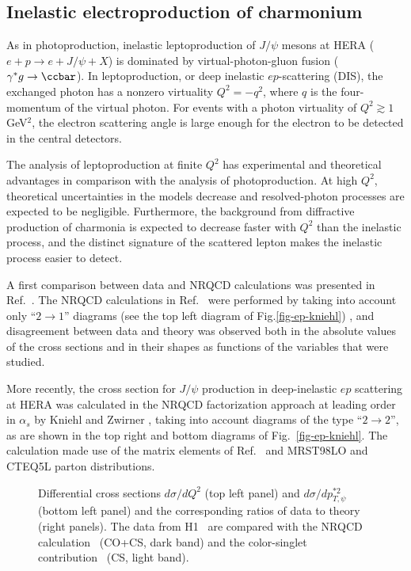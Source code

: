 \subsection{Inelastic electroproduction of charmonium}
\label{prodsec:hera:dis}


As in photoproduction, inelastic leptoproduction of $J/\psi$ mesons at
HERA ($e+p\rightarrow e+J/\psi+X$) is dominated by virtual-photon-gluon
fusion ($\gamma^*g\rightarrow \ccbar$). In leptoproduction, or deep
inelastic $ep$-scattering (DIS), the exchanged photon has a nonzero
virtuality $Q^2=-q^2$, where $q$ is the four-momentum of the virtual
photon. For events with a photon virtuality of $Q^2\gtrsim 1$ GeV$^2$,
the electron scattering angle is large enough for the electron to be
detected in the central detectors.

The analysis of leptoproduction at finite $Q^2$ has experimental and
theoretical advantages in comparison with the analysis of
photoproduction. At high $Q^2$, theoretical uncertainties in the models
decrease and resolved-photon processes are expected to be negligible.
Furthermore, the background from diffractive production of charmonia is
expected to decrease faster with $Q^2$ than the inelastic process, and
the distinct signature of the scattered lepton makes the inelastic
process easier to detect.

A first comparison between data and NRQCD calculations was presented in
Ref.~\cite{Adloff:1999zs}.  The NRQCD calculations in
Ref.~\cite{Adloff:1999zs} were performed by taking into account only
``$2\rightarrow 1$'' diagrams (see the top left diagram of
Fig.\ref{fig-ep-kniehl}) \cite{Fleming:1997fq}, and disagreement between
data and theory was observed both in the absolute values of the cross
sections and in their shapes as functions of the variables that were
studied.

More recently, the cross section for $J/\psi$ production in
deep-inelastic $ep$ scattering at HERA was calculated in the NRQCD
factorization approach at leading order in $\alpha_s$ by Kniehl and
Zwirner \cite{Kniehl:2001tk}, taking into account diagrams of the type
``$2\rightarrow 2$'', as are shown in the top right and bottom diagrams
of Fig.~\ref{fig-ep-kniehl}. The calculation made use of the matrix
elements of Ref.~\cite{Braaten:1999qk} and MRST98LO \cite{Martin:1998sq}
and CTEQ5L \cite{Lai:1999wy} parton distributions.

\begin{figure}
\caption{Differential cross sections $d\sigma / dQ^2$ (top left panel)
and $d\sigma/dp_{T,\psi}^{*2}$ (bottom left panel) and the corresponding
ratios of data to theory (right panels). 
The data from H1~\cite{Adloff:2002ey} are compared
with the NRQCD  calculation~\cite{Kniehl:2001tk} (CO+CS, dark band) and 
the color-singlet contribution~\cite{Kniehl:2001tk} (CS, light band).}
%
\label{fig-ep-q2}
\end{figure}

